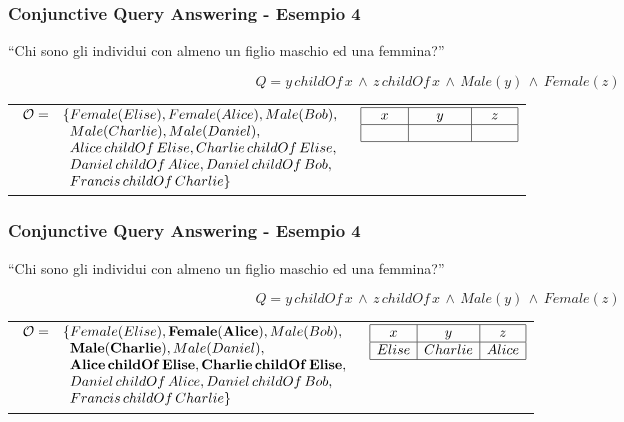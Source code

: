 \documentclass[8pt]{beamer}
\begin{document}
\begin{frame}
\frametitle{Conjunctive Query Answering - Esempio 4}
\begin{center}
``Chi sono gli individui con almeno un figlio maschio ed una femmina?''
\end{center}
\[
 Q=y\,childOf\,x\,\wedge\,z\,childOf\,x\,\wedge\,Male(y)\,\wedge\,Female(z)
\]
\vspace{\baselineskip}

\begin{tabular}{lc}
$\begin{array}{cl}
  \Ont  =  &  \{Female(Elise),  Female(Alice), Male(Bob), \\
  &\phantom{\{}Male(Charlie), Male(Daniel), \\
  &\phantom{\{}Alice\,childOf\,Elise, Charlie\,childOf\,Elise, \\
  &\phantom{\{}Daniel\,childOf\,Alice, Daniel\,childOf\,Bob, \\
  &\phantom{\{}Francis\,childOf\,Charlie \}\\
\end{array}$ & 
$\begin{array}{|c|c|c|}
  \hline
  x&y&z\\
  \hline
  \phantom{Elise}&\phantom{Charlie}&\phantom{Alice}\\
  \hline
\end{array}$ \\
\end{tabular}
\end{frame}

\begin{frame}
\frametitle{Conjunctive Query Answering - Esempio 4}
\begin{center}
``Chi sono gli individui con almeno un figlio maschio ed una femmina?''
\end{center}
\[
 Q=y\,childOf\,x\,\wedge\,z\,childOf\,x\,\wedge\,Male(y)\,\wedge\,Female(z)
\]
\vspace{\baselineskip}

\begin{tabular}{lc}
$\begin{array}{cl}
  \Ont  =  &  \{Female(Elise), \mathbf{Female(Alice)}, Male(Bob), \\
  &\phantom{\{}\mathbf{Male(Charlie)}, Male(Daniel), \\
  &\phantom{\{}\mathbf{Alice\,childOf\,Elise}, \mathbf{Charlie\,childOf\,Elise}, \\
  &\phantom{\{}Daniel\,childOf\,Alice, Daniel\,childOf\,Bob, \\
  &\phantom{\{}Francis\,childOf\,Charlie \}\\
\end{array}$ & 
$\begin{array}{|c|c|c|}
  \hline
  x&y&z\\
  \hline
  Elise&Charlie&Alice\\
  \hline
\end{array}$ \\
\end{tabular}
\end{frame}
\end{document}
